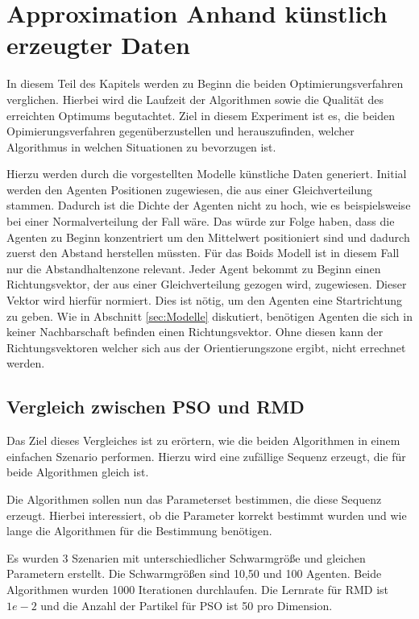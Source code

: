 \section{Approximation Anhand künstlich erzeugter Daten}

In diesem Teil des Kapitels werden zu Beginn die beiden Optimierungsverfahren verglichen.
Hierbei wird die Laufzeit der Algorithmen sowie die Qualität des erreichten Optimums begutachtet.
Ziel in diesem Experiment ist es, die beiden Opimierungsverfahren gegenüberzustellen und herauszufinden, welcher Algorithmus in welchen Situationen zu bevorzugen ist.

Hierzu werden durch die vorgestellten Modelle künstliche Daten generiert. Initial werden den Agenten Positionen zugewiesen, die aus einer Gleichverteilung stammen. Dadurch ist die Dichte der Agenten nicht zu hoch, wie es beispielsweise bei einer Normalverteilung der Fall wäre. Das würde zur Folge haben, dass die Agenten zu Beginn konzentriert um den Mittelwert positioniert sind und dadurch zuerst den Abstand herstellen müssten. Für das Boids Modell ist in diesem Fall nur die Abstandhaltenzone relevant.
Jeder Agent bekommt zu Beginn einen Richtungsvektor, der aus einer Gleichverteilung gezogen wird, zugewiesen. Dieser Vektor wird hierfür normiert. Dies ist nötig, um den Agenten eine Startrichtung zu geben. Wie in Abschnitt \ref{sec:Modelle} diskutiert, benötigen Agenten die sich in keiner Nachbarschaft befinden einen Richtungsvektor. Ohne diesen kann der Richtungsvektoren welcher sich aus der Orientierungszone ergibt, nicht errechnet werden.


\subsection{Vergleich zwischen PSO und RMD}

Das Ziel dieses Vergleiches ist zu erörtern, wie die beiden Algorithmen in einem einfachen Szenario performen. Hierzu wird eine zufällige Sequenz erzeugt, die für beide Algorithmen gleich ist.

Die Algorithmen sollen nun das Parameterset bestimmen, die diese Sequenz erzeugt. Hierbei interessiert, ob die Parameter korrekt bestimmt wurden und wie lange die Algorithmen für die Bestimmung benötigen.

Es wurden 3 Szenarien mit unterschiedlicher Schwarmgröße und gleichen Parametern erstellt.
Die Schwarmgrößen sind 10,50 und 100 Agenten. Beide Algorithmen wurden 1000 Iterationen durchlaufen.
Die Lernrate für RMD ist $1e-2$ und die Anzahl der Partikel für PSO ist 50 pro Dimension.

